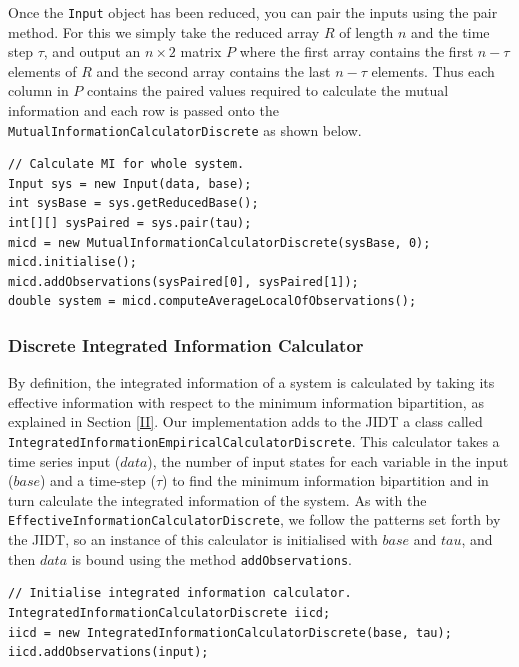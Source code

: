 \documentclass[a4paper,11pt]{article}
\begin{document}
Once the \texttt{Input} object has been reduced, you can pair the inputs using the pair method. For this we simply take the reduced array $R$ of length $n$ and the time step $\tau$, and output an $n \times 2$ matrix $P$ where the first array contains the first $n - \tau$ elements of $R$ and the second array contains the last $n - \tau$ elements. Thus each column in $P$ contains the paired values required to calculate the mutual information and each row is passed onto the \texttt{MutualInformationCalculatorDiscrete} as shown below.

\begin{verbatim}
// Calculate MI for whole system.
Input sys = new Input(data, base);
int sysBase = sys.getReducedBase();
int[][] sysPaired = sys.pair(tau);
micd = new MutualInformationCalculatorDiscrete(sysBase, 0);
micd.initialise();
micd.addObservations(sysPaired[0], sysPaired[1]);
double system = micd.computeAverageLocalOfObservations();
\end{verbatim}

\subsubsection{Discrete Integrated Information Calculator}
\label{sec:impl:ii:calculator}
By definition, the integrated information of a system is calculated by taking its effective information with respect to the minimum information bipartition, as explained in Section \ref{II}. Our implementation adds to the JIDT a class called \texttt{IntegratedInformationEmpiricalCalculatorDiscrete}. This calculator takes a time series input ($data$), the number of input states for each variable in the input ($base$) and a time-step ($\tau$) to find the minimum information bipartition and in turn calculate the integrated information of the system. As with the \texttt{EffectiveInformationCalculatorDiscrete}, we follow the patterns set forth by the JIDT, so an instance of this calculator is initialised with $base$ and $tau$, and then $data$ is bound using the method \texttt{addObservations}.

\begin{verbatim}
// Initialise integrated information calculator.
IntegratedInformationCalculatorDiscrete iicd;
iicd = new IntegratedInformationCalculatorDiscrete(base, tau);
iicd.addObservations(input);
\end{verbatim}
\end{document}
